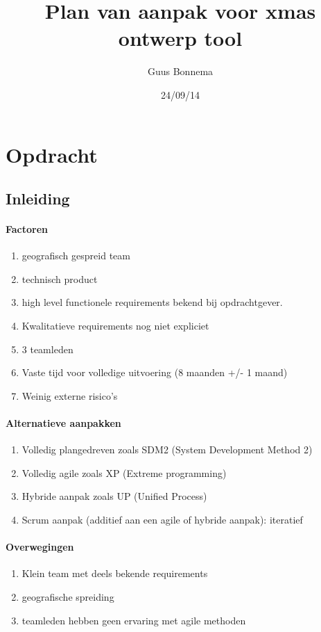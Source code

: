\documentclass[a4paper,11pt,twoside,draft]{article}
\author{Guus Bonnema}
\date{24/09/14}
\title{Plan van aanpak voor xmas ontwerp tool}
\begin{document}
\section{Opdracht}



\subsection{Inleiding}

\paragraph{Factoren}

\begin{enumerate}
\item geografisch gespreid team
\item technisch product
\item high level functionele requirements bekend bij opdrachtgever.
\item Kwalitatieve requirements nog niet expliciet
\item 3 teamleden
\item Vaste tijd voor volledige uitvoering (8 maanden +/- 1 maand)
\item Weinig externe risico's
\end{enumerate}



\paragraph{Alternatieve aanpakken}

\begin{enumerate}
\item Volledig plangedreven zoals SDM2 (System Development Method 2)
\item Volledig agile zoals XP (Extreme programming)
\item Hybride aanpak zoals UP (Unified Process)
\item Scrum aanpak (additief aan een agile of hybride aanpak): iteratief
\end{enumerate}

\paragraph{Overwegingen}

\begin{enumerate}
\item Klein team met deels bekende requirements
\item geografische spreiding
\item teamleden hebben geen ervaring met agile methoden
\end{enumerate}
\end{document}
